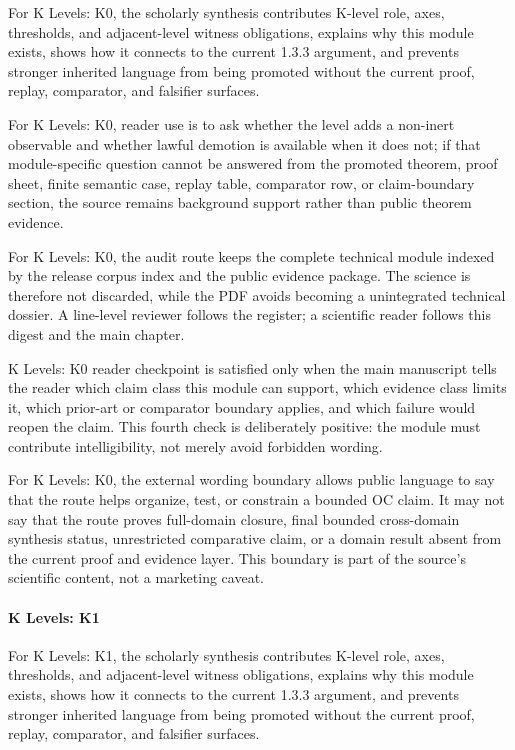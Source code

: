 For K Levels: K0, the scholarly synthesis contributes K-level role, axes, thresholds, and adjacent-level witness obligations, explains why this module exists, shows how it connects to the current 1.3.3 argument, and prevents stronger inherited language from being promoted without the current proof, replay, comparator, and falsifier surfaces.


For K Levels: K0, reader use is to ask whether the level adds a non-inert observable and whether lawful demotion is available when it does not; if that module-specific question cannot be answered from the promoted theorem, proof sheet, finite semantic case, replay table, comparator row, or claim-boundary section, the source remains background support rather than public theorem evidence.


For K Levels: K0, the audit route keeps the complete technical module indexed by the release corpus index and the public evidence package. The science is therefore not discarded, while the PDF avoids becoming a unintegrated technical dossier. A line-level reviewer follows the register; a scientific reader follows this digest and the main chapter.


K Levels: K0 reader checkpoint is satisfied only when the main manuscript tells the reader which claim class this module can support, which evidence class limits it, which prior-art or comparator boundary applies, and which failure would reopen the claim. This fourth check is deliberately positive: the module must contribute intelligibility, not merely avoid forbidden wording.


For K Levels: K0, the external wording boundary allows public language to say that the route helps organize, test, or constrain a bounded OC claim. It may not say that the route proves full-domain closure, final bounded cross-domain synthesis status, unrestricted comparative claim, or a domain result absent from the current proof and evidence layer. This boundary is part of the source's scientific content, not a marketing caveat.


\paragraph{K Levels: K1}

For K Levels: K1, the scholarly synthesis contributes K-level role, axes, thresholds, and adjacent-level witness obligations, explains why this module exists, shows how it connects to the current 1.3.3 argument, and prevents stronger inherited language from being promoted without the current proof, replay, comparator, and falsifier surfaces.



